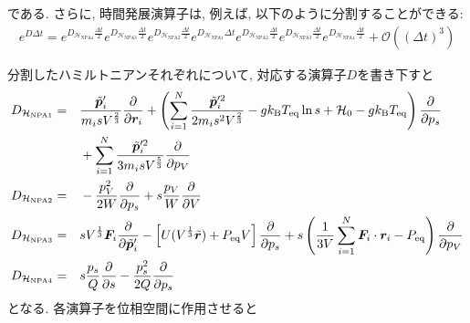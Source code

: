 である. さらに, 時間発展演算子は, 例えば, 以下のように分割することができる:
\begin{align}
  e^{D \Delta t} =
  e^{D_{\mathcal{H}_{\mathrm{NPA}4}} \frac{\Delta t}{2}}
  e^{D_{\mathcal{H}_{\mathrm{NPA}3}} \frac{\Delta t}{2}}
  e^{D_{\mathcal{H}_{\mathrm{NPA}2}} \frac{\Delta t}{2}}
  e^{D_{\mathcal{H}_{\mathrm{NPA}1}} \Delta t}
  e^{D_{\mathcal{H}_{\mathrm{NPA}2}} \frac{\Delta t}{2}}
  e^{D_{\mathcal{H}_{\mathrm{NPA}3}} \frac{\Delta t}{2}}
  e^{D_{\mathcal{H}_{\mathrm{NPA}4}} \frac{\Delta t}{2}}
  +
  \mathcal{O}((\Delta t)^{3})
  \label{Eq:Time_Dev_Operation_Nose_Poincare_Andersen}
\end{align}

分割したハミルトニアンそれぞれについて, 対応する演算子$D$を書き下すと
\begin{alignat}{3}
  D_{\mathcal{H}_{\mathrm{NPA}1}}
  &=&&
  \frac{\Tilde{\bm{p}}_{i}^{\prime}}{m_{i} s V^{\frac{2}{3}}}
  \frac{\partial}{\partial \bm{r}_{i}}
  +
  \left(
    \sum_{i=1}^{N}
    \frac{\Tilde{\bm{p}}_{i}^{\prime 2}}{2m_{i}s^{2}V^{\frac{2}{3}}}
    -
    g k_{\mathrm{B}} T_{\mathrm{eq}} \ln s
    +
    \mathcal{H}_{0}
    -
    g k_{\mathrm{B}} T_{\mathrm{eq}}
  \right)
  \frac{\partial}{\partial p_{s}}
  \notag \\
  & &&+
  \sum_{i=1}^{N}
  \frac{\Tilde{\bm{p}}_{i}^{\prime 2}}{3m_{i} s V^{\frac{5}{3}}}
  \frac{\partial}{\partial p_{V}}
  \\
  D_{\mathcal{H}_{\mathrm{NPA}2}}
  &=&&
  -
  \frac{p_{V}^{2}}{2W}
  \frac{\partial}{\partial p_{s}}
  +
  s
  \frac{p_{V}}{W}
  \frac{\partial}{\partial V}
  \\
  D_{\mathcal{H}_{\mathrm{NPA}3}}
  &=&&
  s V^{\frac{1}{3}} \bm{F}_{i}
  \frac{\partial}{\partial \Tilde{\bm{p}}_{i}^{\prime}}
  -
  \left[
    U(V^{\frac{1}{3}} \Tilde{\bm{r}}) + P_{\mathrm{eq}}V
  \right]
  \frac{\partial}{\partial p_{s}}
  +
  s
  \left(
    \frac{1}{3V}
    \sum_{i=1}^{N} \bm{F}_{i} \cdot \bm{r}_{i}
    -
    P_{\mathrm{eq}}
  \right)
  \frac{\partial}{\partial p_{V}}
  \\
  D_{\mathcal{H}_{\mathrm{NPA}4}}
  &=&&
  s
  \frac{p_{s}}{Q}
  \frac{\partial}{\partial s}
  -
  \frac{p_{s}^{2}}{2Q}
  \frac{\partial}{\partial p_{s}}
\end{alignat}
となる. 各演算子を位相空間に作用させると


